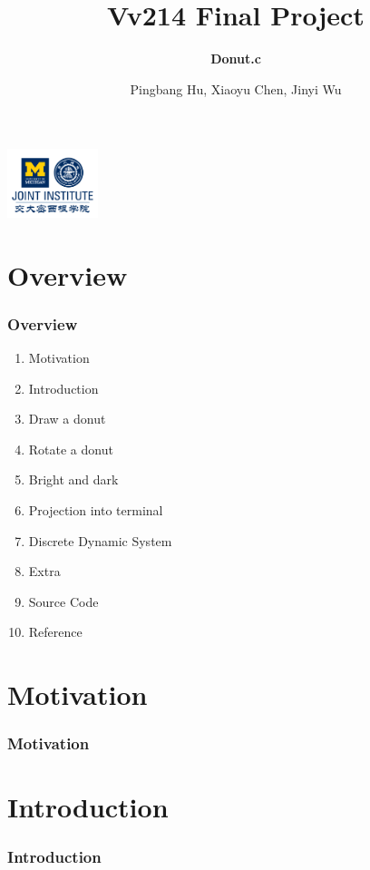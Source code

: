 \documentclass[12pt, t]{beamer}
\title{Vv214 Final Project}
\subtitle{\textbf{Donut.c}}
\institute[UM-SJTU JI]{University of Michigan-Shanghai Jiao Tong University Joint Institute}
\author{Pingbang Hu,  Xiaoyu Chen, Jinyi Wu}
\begin{document}
\begin{frame}
    \titlepage
    \begin{center}
        \includegraphics[height=2cm]{Figures/logo/logo2.png}
    \end{center}
\end{frame}

\section{Overview}
    \begin{frame}
        \frametitle{Overview}
        \begin{enumerate}
            \item Motivation
            \item Introduction
            \item Draw a donut
            \item Rotate a donut
            \item Bright and dark
            \item Projection into terminal
            \item Discrete Dynamic System
            \item Extra
            \item Source Code
            \item Reference
        \end{enumerate}
    \end{frame}


\section{Motivation}
\begin{frame}
    \frametitle{Motivation}

\end{frame}


\section{Introduction}
\begin{frame}
    \frametitle{Introduction}

\end{frame}
\end{document}
